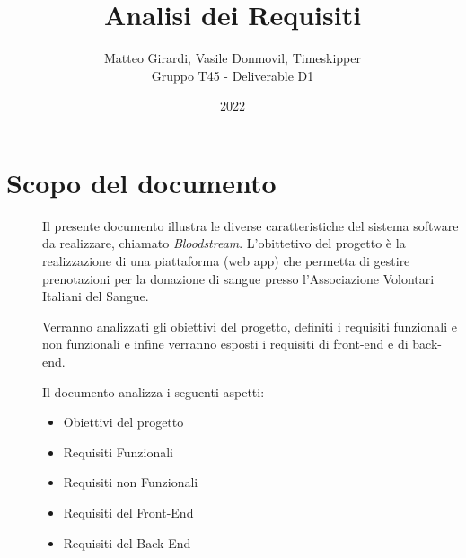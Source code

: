 \documentclass{article}
\title{\textbf{\Huge Analisi dei Requisiti}}
\author{Matteo Girardi, Vasile Donmovil, Timeskipper \\ Gruppo T45 - Deliverable D1}
\date{2022}
\begin{document}
\maketitle

\clearpage
\tableofcontents
\clearpage

\section{Scopo del documento}
\begin{description}
    \item[] Il presente documento illustra le diverse caratteristiche del sistema software da realizzare, chiamato \textit{Bloodstream}. L’obittetivo del progetto è la realizzazione di una piattaforma (web app) che permetta di gestire prenotazioni per la donazione di sangue presso l’Associazione Volontari Italiani del Sangue.
    \item[] Verranno analizzati gli obiettivi del progetto, definiti i requisiti funzionali e non funzionali e infine verranno esposti i requisiti di front-end e di back-end.
    \item[] Il documento analizza i seguenti aspetti:
    	\begin{itemize}
    	\item Obiettivi del progetto
    	\item Requisiti Funzionali
    	\item Requisiti non Funzionali
    	\item Requisiti del Front-End
    	\item Requisiti del Back-End
    	\end{itemize}
\end{description}
\clearpage
\end{document}
